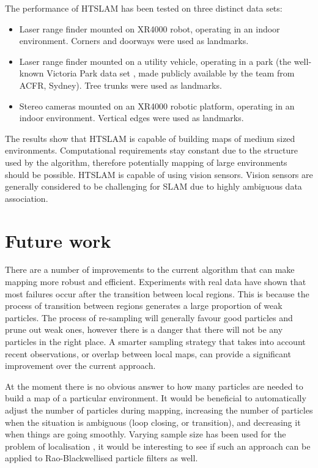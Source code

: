 The performance of HTSLAM has been tested on three distinct data sets:

\begin{itemize}
\item Laser range finder mounted on XR4000 robot, operating in an indoor
environment. Corners and doorways were used as landmarks.

\item Laser range finder mounted on a utility vehicle, operating in a
  park (the well-known Victoria Park data set \cite{VP_dataset}, made
  publicly available by the team from ACFR, Sydney). Tree trunks were
  used as landmarks.

\item Stereo cameras mounted on an XR4000 robotic platform, operating
  in an indoor environment. Vertical edges were used as landmarks.

\end{itemize}

The results show that HTSLAM is capable of building maps of medium
sized environments. Computational requirements stay constant due to
the structure used by the algorithm, therefore potentially mapping of
large environments should be possible. HTSLAM is capable of using
vision sensors. Vision sensors are generally considered to be
challenging for SLAM due to highly ambiguous data association.


\section{Future work}

There are a number of improvements to the current algorithm that can
make mapping more robust and efficient. Experiments with real data
have shown that most failures occur after the transition between local
regions. This is because the process of transition between regions
generates a large proportion of weak particles. The process of
re-sampling will generally favour good particles and prune out weak
ones, however there is a danger that there will not be any particles
in the right place. A smarter sampling strategy that takes into
account recent observations, or overlap between local maps, can
provide a significant improvement over the current approach.

At the moment there is no obvious answer to how many particles are
needed to build a map of a particular environment. It would be
beneficial to automatically adjust the number of particles during
mapping, increasing the number of particles when the situation is
ambiguous (loop closing, or transition), and decreasing it when things
are going smoothly. Varying sample size has been used for the problem
of localisation \cite{KLDSampling}, it would be interesting to see if
such an approach can be applied to Rao-Blackwellised particle filters
as well.

